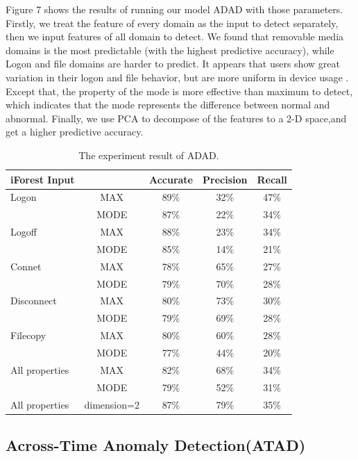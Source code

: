 \documentclass[conference]{IEEEtran}
\begin{document}
Figure 7 shows the results of running our model ADAD with those parameters. Firstly, we treat the feature of every domain as the input to detect separately, then we input features of all domain to detect. We found that removable media domains is the most predictable (with the highest predictive accuracy), while Logon and file domains are harder to predict. It appears that users show great variation in their logon and file behavior, but are more uniform in device usage . Except that, the property of the mode is more effective than maximum to detect, which indicates that the mode  represents the difference between normal and abnormal. Finally, we use PCA to decompose of the features to a 2-D space,and get a higher predictive accuracy.


\begin{table}[tbp]
\caption{The experiment result of ADAD.}
\centering  %
\begin{tabular}{lcccc}  %
\hline
iForest Input & 	&Accurate &Precision &Recall\\ \hline
	
Logon 	& MAX &89\% &32\% &47\%\\
  & MODE &87\% &22\% &34\%\\\hline
Logoff 	& MAX &88\% &23\% &34\%\\
   & MODE &85\% &14\% &21\%\\\hline
Connet 	& MAX &78\% &65\% &27\%\\
  & MODE &79\% &70\% &28\%\\\hline
Disconnect 	& MAX &80\% &73\% &30\%\\
  & MODE &79\% &69\% &28\%\\\hline
Filecopy 	& MAX &80\% &60\% &28\%\\
  & MODE &77\% &44\% &20\%\\\hline
All properties 	& MAX &82\% &68\% &34\%\\
  & MODE &79\% &52\% &31\%\\\hline
All properties 	& dimension=2 &87\% &79\% &35\%\\\hline

\end{tabular}

\end{table}


\subsection{Across-Time Anomaly Detection(ATAD)}
\end{document}
